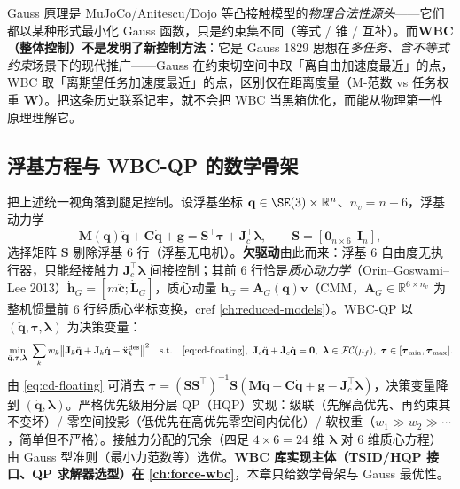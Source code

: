 \begin{insight}
Gauss 原理是 MuJoCo/Anitescu/Dojo 等凸接触模型的\emph{物理合法性源头}——它们都以某种形式最小化 Gauss 函数，只是约束集不同（等式 / 锥 / 互补）。而\textbf{WBC（整体控制）不是发明了新控制方法}：它是 Gauss 1829 思想在\emph{多任务、含不等式约束}场景下的现代推广——Gauss 在约束切空间中取「离自由加速度最近」的点，WBC 取「离期望任务加速度最近」的点，区别仅在距离度量（M-范数 vs 任务权重 $\mathbf W$）。把这条历史联系记牢，就不会把 WBC 当黑箱优化，而能从物理第一性原理理解它。
\end{insight}

\subsection{浮基方程与 WBC-QP 的数学骨架}
把上述统一视角落到腿足控制。设浮基坐标 $\mathbf q\in\SE(3)\times\mathbb R^n$、$n_v=n+6$，浮基动力学
\begin{equation}
  \mathbf M(\mathbf q)\ddot{\mathbf q}+\mathbf C\dot{\mathbf q}+\mathbf g=\mathbf S^\top\boldsymbol\tau+\mathbf J_c^\top\boldsymbol\lambda,\qquad \mathbf S=[\mathbf 0_{n\times6}\ \ \mathbf I_n],
  \label{eq:cd-floating}
\end{equation}
选择矩阵 $\mathbf S$ 剔除浮基 $6$ 行（浮基无电机）。\textbf{欠驱动}由此而来：浮基 $6$ 自由度无执行器，只能经接触力 $\mathbf J_c^\top\boldsymbol\lambda$ 间接控制；其前 $6$ 行恰是\emph{质心动力学}（Orin--Goswami--Lee 2013\cite{orin2013centroidal}）$\dot{\mathbf h}_G=[m\ddot{\mathbf c};\dot{\mathbf L}_G]$，质心动量 $\mathbf h_G=\mathbf A_G(\mathbf q)\mathbf v$（CMM，$\mathbf A_G\in\mathbb R^{6\times n_v}$ 为整机惯量前 $6$ 行经质心坐标变换，cref \cref{ch:reduced-models}）。WBC-QP 以 $(\ddot{\mathbf q},\boldsymbol\tau,\boldsymbol\lambda)$ 为决策变量：
\begin{equation}
  \min_{\ddot{\mathbf q},\boldsymbol\tau,\boldsymbol\lambda}\ \sum_k w_k\big\|\mathbf J_k\ddot{\mathbf q}+\dot{\mathbf J}_k\dot{\mathbf q}-\ddot{\mathbf x}_k^{\text{des}}\big\|^2\quad\text{s.t.}\quad \text{\cref{eq:cd-floating}},\ \mathbf J_c\ddot{\mathbf q}+\dot{\mathbf J}_c\dot{\mathbf q}=\mathbf 0,\ \boldsymbol\lambda\in\mathcal{FC}(\mu_f),\ \boldsymbol\tau\in[\boldsymbol\tau_{\min},\boldsymbol\tau_{\max}].
  \label{eq:cd-wbc}
\end{equation}
由 \cref{eq:cd-floating} 可消去 $\boldsymbol\tau=(\mathbf S\mathbf S^\top)^{-1}\mathbf S(\mathbf M\ddot{\mathbf q}+\mathbf C\dot{\mathbf q}+\mathbf g-\mathbf J_c^\top\boldsymbol\lambda)$，决策变量降到 $(\ddot{\mathbf q},\boldsymbol\lambda)$。严格优先级用分层 QP（HQP）实现：级联（先解高优先、再约束其不变坏）/ 零空间投影（低优先在高优先零空间内优化）/ 软权重（$w_1\gg w_2\gg\cdots$，简单但不严格）。接触力分配的冗余（四足 $4\times6=24$ 维 $\boldsymbol\lambda$ 对 $6$ 维质心方程）由 Gauss 型准则（最小力范数等）选优。\textbf{WBC 库实现主体（TSID/HQP 接口、QP 求解器选型）在 \cref{ch:force-wbc}}，本章只给数学骨架与 Gauss 最优性。

